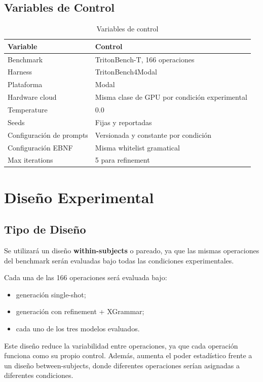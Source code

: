 \documentclass[12pt]{article}
\begin{document}
\subsection{Variables de Control}

\begin{table}[H]
\centering
\begin{tabular}{p{} p{}}
\toprule
\textbf{Variable} & \textbf{Control} \\
\midrule
Benchmark & TritonBench-T, 166 operaciones \\
Harness & TritonBench4Modal \\
Plataforma & Modal \\
Hardware cloud & Misma clase de GPU por condición experimental \\
Temperature & 0.0 \\
Seeds & Fijas y reportadas \\
Configuración de prompts & Versionada y constante por condición \\
Configuración EBNF & Misma whitelist gramatical \\
Max iterations & 5 para refinement \\
\bottomrule
\end{tabular}
\caption{Variables de control}
\end{table}

\section{Diseño Experimental}

\subsection{Tipo de Diseño}

Se utilizará un diseño \textbf{within-subjects} o pareado, ya que las mismas operaciones del benchmark serán evaluadas bajo todas las condiciones experimentales.

Cada una de las 166 operaciones será evaluada bajo:

\begin{itemize}
    \item generación single-shot;
    \item generación con refinement + XGrammar;
    \item cada uno de los tres modelos evaluados.
\end{itemize}

Este diseño reduce la variabilidad entre operaciones, ya que cada operación funciona como su propio control. Además, aumenta el poder estadístico frente a un diseño between-subjects, donde diferentes operaciones serían asignadas a diferentes condiciones.
\end{document}
